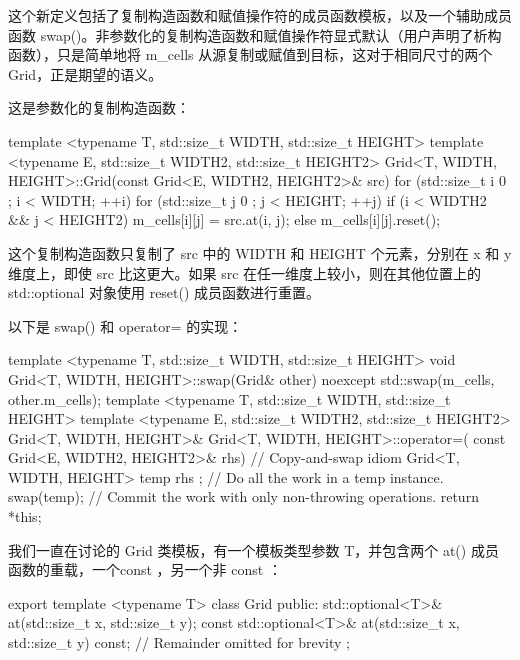 这个新定义包括了复制构造函数和赋值操作符的成员函数模板，以及一个辅助成员函数 swap()。非参数化的复制构造函数和赋值操作符显式默认（用户声明了析构函数），只是简单地将 m\_cells 从源复制或赋值到目标，这对于相同尺寸的两个Grid，正是期望的语义。

这是参数化的复制构造函数：

\begin{cpp}
template <typename T, std::size_t WIDTH, std::size_t HEIGHT>
template <typename E, std::size_t WIDTH2, std::size_t HEIGHT2>
Grid<T, WIDTH, HEIGHT>::Grid(const Grid<E, WIDTH2, HEIGHT2>& src)
{
    for (std::size_t i { 0 }; i < WIDTH; ++i) {
        for (std::size_t j { 0 }; j < HEIGHT; ++j) {
            if (i < WIDTH2 && j < HEIGHT2) {
                m_cells[i][j] = src.at(i, j);
            } else {
                m_cells[i][j].reset();
            }
        }
    }
}
\end{cpp}

这个复制构造函数只复制了 src 中的 WIDTH 和 HEIGHT 个元素，分别在 x 和 y 维度上，即使 src 比这更大。如果 src 在任一维度上较小，则在其他位置上的 std::optional 对象使用 reset() 成员函数进行重置。

以下是 swap() 和 operator= 的实现：

\begin{cpp}
template <typename T, std::size_t WIDTH, std::size_t HEIGHT>
void Grid<T, WIDTH, HEIGHT>::swap(Grid& other) noexcept
{
    std::swap(m_cells, other.m_cells);
}
template <typename T, std::size_t WIDTH, std::size_t HEIGHT>
template <typename E, std::size_t WIDTH2, std::size_t HEIGHT2>
Grid<T, WIDTH, HEIGHT>& Grid<T, WIDTH, HEIGHT>::operator=(
    const Grid<E, WIDTH2, HEIGHT2>& rhs)
{
    // Copy-and-swap idiom
    Grid<T, WIDTH, HEIGHT> temp { rhs }; // Do all the work in a temp instance.
    swap(temp); // Commit the work with only non-throwing operations.
    return *this;
}
\end{cpp}




我们一直在讨论的 Grid 类模板，有一个模板类型参数 T，并包含两个 at() 成员函数的重载，一个const ，另一个非 const ：

\begin{cpp}
export template <typename T>
class Grid
{
    public:
        std::optional<T>& at(std::size_t x, std::size_t y);
        const std::optional<T>& at(std::size_t x, std::size_t y) const;
        // Remainder omitted for brevity
};
\end{cpp}

